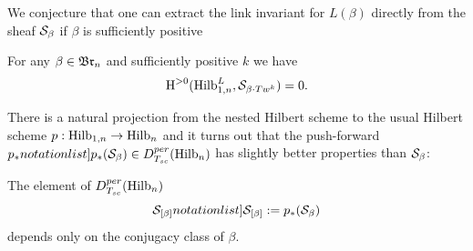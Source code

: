 \documentclass[10pt]{amsart}
\begin{document}
We conjecture that one can extract the link invariant for $L(\beta)$ directly from the sheaf $\mathcal{S}_\beta$ if $\beta$ is sufficiently positive

\begin{conjecture} For any \(\beta\in\mathfrak{Br}_n\) and sufficiently positive \(k\) we have  \[\textup{H}^{>0}(\mathrm{Hilb}^L_{1,n},\mathcal{S}_{\beta\cdot Tw^k})=0.\]
\end{conjecture}


There is a natural projection from the nested Hilbert scheme to the usual Hilbert scheme $p: \mathrm{Hilb}_{1,n}\to\mathrm{Hilb}_n$ and  it turns out that the push-forward $\SymbolPrint{p_*}(\mathcal{S}_\beta)\in
D_{T_{sc}}^{per}(\Hilb_n)$  has slightly better properties than
$\mathcal{S}_\beta$:

\begin{theorem} The element of \(D_{T_{sc}}^{per}(\mathrm{Hilb}_n)\)
$$\SymbolPrint{\calS_{[\beta]}}:=p_*(\calS_\beta)$$
depends only on the conjugacy class of $\beta$.
\end{theorem}








\end{document}
